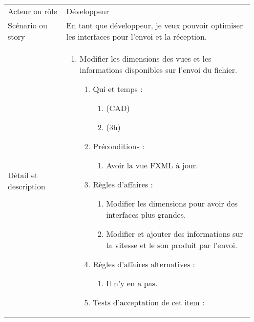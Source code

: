 \begin{longtable}{|l|p{}|}
\hline
    \rowcolor{Gray}
    \multicolumn{2}{|l|}{4} \\
\hline
    Acteur ou rôle & Développeur \\
\hline
    Scénario ou story & En tant que développeur, je veux pouvoir optimiser les interfaces pour l'envoi et la réception. \\
\hline
    Détail et description &
        \begin{enumerate}[label*=\arabic*.]
            \item Modifier les dimensions des vues et les informations disponibles sur l'envoi du fichier.
                \begin{enumerate}[label*=\arabic*.]
                                \item Qui et temps :
                                \begin{enumerate}[label*=\arabic*.]
                                    \item (CAD)
                                    \item (3h)
                                \end{enumerate}
                                \item Préconditions :
                                \begin{enumerate}[label*=\arabic*.]
                                    \item Avoir la vue FXML à jour.
                                \end{enumerate}
                                \item Règles d'affaires :
                                \begin{enumerate}[label*=\arabic*.]
                                    \item Modifier les dimensions pour avoir des interfaces plus grandes.
                                    \item Modifier et ajouter des informations sur la vitesse et le son produit par l'envoi.
                                \end{enumerate}
                                \item Règles d'affaires alternatives :
                                \begin{enumerate}[label*=\arabic*.]
                                    \item Il n'y en a pas.
                                \end{enumerate}
                                \item Tests d'acceptation de cet item :

\end{enumerate}
\end{enumerate}
\end{longtable}
